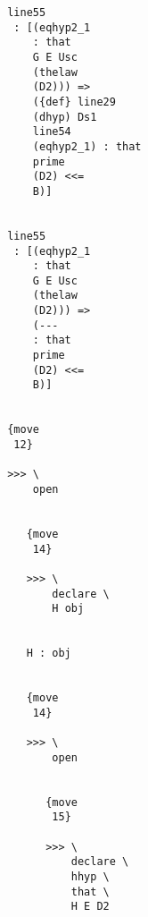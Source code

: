 \documentclass[12pt]{article}
\begin{document}
\begin{verbatim}
                                       line55 
                                        : [(eqhyp2_1 
                                           : that 
                                           G E Usc 
                                           (thelaw 
                                           (D2))) => 
                                           ({def} line29 
                                           (dhyp) Ds1 
                                           line54 
                                           (eqhyp2_1) : that 
                                           prime 
                                           (D2) <<= 
                                           B)]


                                       line55 
                                        : [(eqhyp2_1 
                                           : that 
                                           G E Usc 
                                           (thelaw 
                                           (D2))) => 
                                           (--- 
                                           : that 
                                           prime 
                                           (D2) <<= 
                                           B)]


                                       {move 
                                        12}

                                       >>> \
                                           open


                                          {move 
                                           14}

                                          >>> \
                                              declare \
                                              H obj


                                          H : obj


                                          {move 
                                           14}

                                          >>> \
                                              open


                                             {move 
                                              15}

                                             >>> \
                                                 declare \
                                                 hhyp \
                                                 that \
                                                 H E D2



\end{verbatim}
\end{document}
